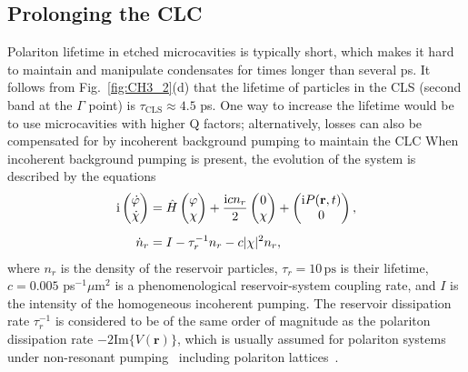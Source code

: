 \subsection{Prolonging the CLC}
Polariton lifetime in etched microcavities is typically short, which makes it hard to maintain and manipulate condensates for times longer than several ps.
It follows from Fig.~\ref{fig:CH3_2}(d) that the lifetime of particles in the CLS (second band at the $\Gamma$ point) is $\tau_\textrm{CLS}\approx4.5$ ps.
One way to increase the lifetime would be to use microcavities with higher Q factors; alternatively, losses can also be compensated for by incoherent background pumping to maintain the CLC
When incoherent background pumping is present, the evolution of the system is described by the equations
%
\begin{subequations}\label{CH3_INC}
\begin{align}
 \mathrm{i}\begin{pmatrix}\dot{\varphi}\\\dot{\chi}\end{pmatrix} &=
 \hat{H}\begin{pmatrix}{\varphi}\\{\chi}\end{pmatrix}
 +\frac{{\mathrm{i}}cn_r}{2}\begin{pmatrix}{0}\\{\chi}\end{pmatrix}
 +\begin{pmatrix}{\mathrm{i}P(\mathbf{r},t)}\\{0}\end{pmatrix}, \\[5pt]
 \dot{n}_r &= I - \tau_r^{-1} n_r-c|\chi|^2n_r,
\end{align}
\end{subequations}
%
where $n_r$ is the density of the reservoir particles, $\tau_r=10\,\mathrm{ps}$ is their lifetime, $c=0.005$ ps$^{-1}\mu$m$^2$ is a phenomenological reservoir-system coupling rate, and $I$ is the intensity of the homogeneous incoherent pumping.
The reservoir dissipation rate $\tau_r^{-1}$ is considered to be of the same order of magnitude as the polariton dissipation rate $-2\mathrm{Im}\{V(\mathbf{r})\}$, which is usually assumed for polariton systems under non-resonant pumping~\cite{Ostrovskaya:2012aa,Ma:2016aa} including polariton lattices~\cite{Ma:2015aa,Yulin:2016aa}.%
